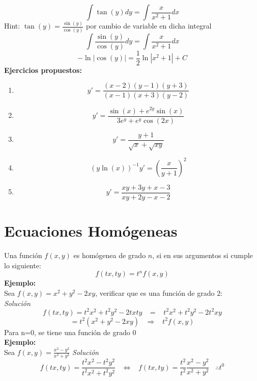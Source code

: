 \documentclass[10pt]{article}
\begin{document}
\[\int \tan(y)dy=\int\frac{x}{x^{2}+1}dx\]
Hint: $\tan(y)=\frac{\sin(y)}{\cos(y)}$ por cambio de variable en dicha integral
\[\int\frac{\sin(y)}{\cos(y)}dy=\int\frac{x}{x^{2}+1}dx\]
\[-\ln\left|\cos(y)\right|=\frac{1}{2}\ln\left|x^{2}+1\right|+C\]
\clearpage
\textbf{Ejercicios propuestos:}
\begin{enumerate}
  \item \[y'=\frac{(x-2)(y-1)(y+3)}{(x-1)(x+3)(y-2)}\]
  \item \[y'=\frac{\sin(x)+e^{2y}\sin(x)}{3e^{y}+e^{y}\cos(2x)}\]
  \item \[y'=\frac{y+1}{\sqrt{x}+\sqrt{xy}}\]
  \item \[\left(y\ln(x)\right)^{-1}y'=\left(\frac{x}{y+1}\right)^{2}\]
  \item \[y'=\frac{xy+3y+x-3}{xy+2y-x-2}\]
\end{enumerate}

\section{Ecuaciones Homógeneas}
Una función $f(x,y)$ es homógenea de grado $n$, si en sus argumentos si cumple lo siguiente:\\
\[f(tx,ty)=t^{n}f(x,y)\]
\textbf{Ejemplo:}
\\Sea $f(x,y)=x^{2}+y^{2}-2xy$, verificar que es una función de grado $2$:\\
\textit{Solución}
\[f(tx,ty)=t^{2}x^{2}+t^{2}y^{2}-2txty\;\;\;=\;\;\;t^{2}x^{2}+t^{2}y^{2}-2t^{2}xy\]
\[=t^{2}(x^{2}+y^{2}-2xy)\;\;\;\Rightarrow\;\;\;t^{2}f(x,y)\]
Para n=0, se tiene una función de grado $0$\\
\textbf{Ejemplo:}\\
Sea $f(x,y)=\frac{x^{2}-y^{2}}{x^{2}+y^{2}}$
\textit{Solución}
\[f(tx,ty)=\frac{t^{2}x^{2}-t^{2}y^{2}}{t^{2}x^{2}+t^{2}y^{2}}\;\;\;\Leftrightarrow\;\;\;f(tx,ty)=\frac{t^{2}}{t^{2}}\frac{x^{2}-y^{2}}{x^{2}+y^{2}}\;\;\;\therefore t^{0}\]
\clearpage
\end{document}
